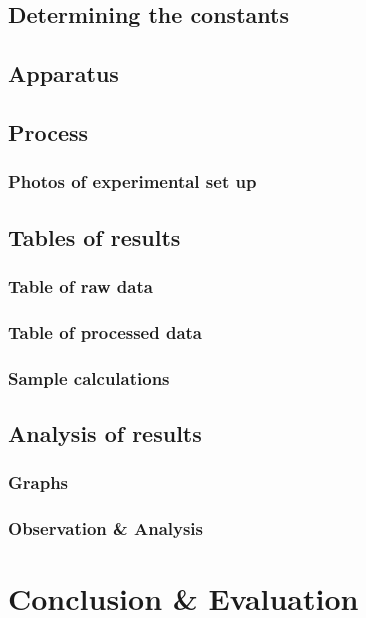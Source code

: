 \documentclass[12pt]{article}
\begin{document}
\begin{flushleft}
            \subsection{Determining the constants}
                
            \subsection{Apparatus}
                
            \subsection{Process}
                
                \subsubsection*{Photos of experimental set up}
                    
            \subsection{Tables of results}
                \FloatBarrier  
                \subsubsection*{Table of raw data}
                    
                \subsubsection*{Table of processed data}
                    
                \subsubsection*{Sample calculations}
                    
            \subsection{Analysis of results}
                \subsubsection*{Graphs}    
                    
                \subsubsection*{Observation \& Analysis}
                    
        \section{Conclusion \& Evaluation}
            
        
    \end{flushleft}
\end{document}
